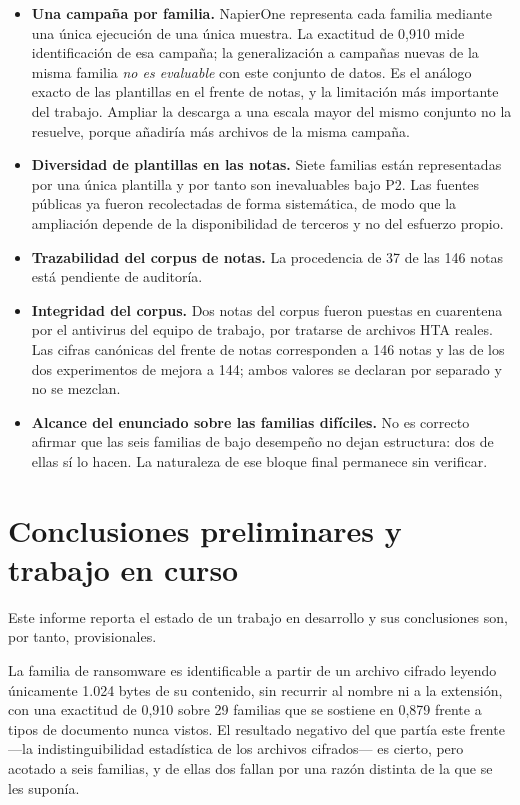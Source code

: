 \documentclass[11pt,a4paper]{article}
\begin{document}
\begin{itemize}
\item \textbf{Una campaña por familia.} NapierOne representa cada familia mediante una única
ejecución de una única muestra. La exactitud de 0,910 mide identificación de esa campaña; la
generalización a campañas nuevas de la misma familia \emph{no es evaluable} con este conjunto
de datos. Es el análogo exacto de las plantillas en el frente de notas, y la limitación más
importante del trabajo. Ampliar la descarga a una escala mayor del mismo conjunto no la
resuelve, porque añadiría más archivos de la misma campaña.
\item \textbf{Diversidad de plantillas en las notas.} Siete familias están representadas por
una única plantilla y por tanto son inevaluables bajo P2. Las fuentes públicas ya fueron
recolectadas de forma sistemática, de modo que la ampliación depende de la disponibilidad de
terceros y no del esfuerzo propio.
\item \textbf{Trazabilidad del corpus de notas.} La procedencia de 37 de las 146 notas está
pendiente de auditoría.
\item \textbf{Integridad del corpus.} Dos notas del corpus fueron puestas en cuarentena por el
antivirus del equipo de trabajo, por tratarse de archivos HTA reales. Las cifras canónicas del
frente de notas corresponden a 146 notas y las de los dos experimentos de mejora a 144; ambos
valores se declaran por separado y no se mezclan.
\item \textbf{Alcance del enunciado sobre las familias difíciles.} No es correcto afirmar que
las seis familias de bajo desempeño no dejan estructura: dos de ellas sí lo hacen. La
naturaleza de ese bloque final permanece sin verificar.
\end{itemize}

\section{Conclusiones preliminares y trabajo en curso}

Este informe reporta el estado de un trabajo en desarrollo y sus conclusiones son, por tanto,
provisionales.

La familia de ransomware es identificable a partir de un archivo cifrado leyendo únicamente
1.024 bytes de su contenido, sin recurrir al nombre ni a la extensión, con una exactitud de
0,910 sobre 29 familias que se sostiene en 0,879 frente a tipos de documento nunca vistos.
El resultado negativo del que partía este frente ---la indistinguibilidad estadística de los
archivos cifrados--- es cierto, pero acotado a seis familias, y de ellas dos fallan por una
razón distinta de la que se les suponía.
\end{document}
